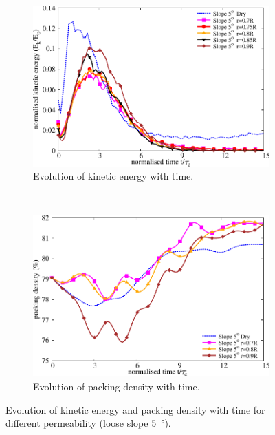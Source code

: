 \begin{figure}
\centering
\begin{subfigure}[b]{0.95\textwidth}
\includegraphics[width=0.95\columnwidth]{KE_loose_5_slope}
\caption{Evolution of kinetic energy with time.}
\label{fig:KE5}
\end{subfigure} \\
\begin{subfigure}[b]{0.95\textwidth}
\centering
\includegraphics[width=0.95\columnwidth]{Voronoi_5}
\caption{Evolution of packing density with time.}
\label{fig:voro5}
\end{subfigure}
\caption{Evolution of kinetic energy and packing density with time for 
different permeability (loose slope \SI{5}{\degree}).}
\label{fig:voro_ke_5}
\end{figure}

